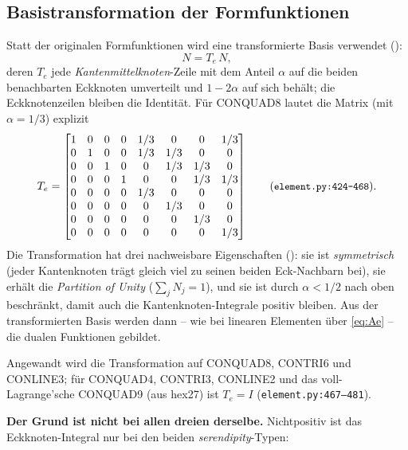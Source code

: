 \documentclass[a4paper,11pt]{article}
\def\bm#1{#1}%
\def\tfrac#1#2{#1/#2}%
\def\tilde#1{#1}%
\newcommand{\file}[1]{\texttt{\small #1}}
\begin{document}
\subsection{Basistransformation der Formfunktionen}
Statt der originalen Formfunktionen wird eine transformierte Basis verwendet
(\citealp[Gl.~(4.5)]{popp2012}):
\begin{equation}
\tilde{\bm N} = \bm T_e\,\bm N,
\end{equation}
deren $\bm T_e$ jede \emph{Kantenmittelknoten}-Zeile mit dem Anteil $\alpha$ auf die beiden
benachbarten Eckknoten umverteilt und $1-2\alpha$ auf sich behält; die Eckknotenzeilen bleiben die
Identität. Für CONQUAD8 lautet die Matrix (mit $\alpha=\tfrac13$) explizit
\begin{equation}
\bm T_e=\begin{bmatrix}
1&0&0&0&\tfrac13&0&0&\tfrac13\\
0&1&0&0&\tfrac13&\tfrac13&0&0\\
0&0&1&0&0&\tfrac13&\tfrac13&0\\
0&0&0&1&0&0&\tfrac13&\tfrac13\\
0&0&0&0&\tfrac13&0&0&0\\
0&0&0&0&0&\tfrac13&0&0\\
0&0&0&0&0&0&\tfrac13&0\\
0&0&0&0&0&0&0&\tfrac13
\end{bmatrix}
\qquad (\text{\file{element.py:\allowbreak{}424--468}}).
\end{equation}
Die Transformation hat drei nachweisbare Eigenschaften (\citealp[S.~B431]{popp2012}): sie ist
\emph{symmetrisch} (jeder Kantenknoten trägt gleich viel zu seinen beiden Eck-Nachbarn bei), sie
erhält die \emph{Partition of Unity} ($\sum_j \tilde N_j = 1$), und sie ist durch
$\alpha < \tfrac12$ nach oben beschränkt, damit auch die Kantenknoten-Integrale positiv bleiben. Aus
der transformierten Basis werden dann -- wie bei linearen Elementen über \eqref{eq:Ae} -- die dualen
Funktionen gebildet.

Angewandt wird die Transformation auf CONQUAD8, CONTRI6 und CONLINE3; für CONQUAD4, CONTRI3,
CONLINE2 und das voll-Lagrange'sche CONQUAD9 (aus hex27) ist $\bm T_e=\bm I$
(\file{element.py:\allowbreak{}467--481}).

\medskip
\noindent\textbf{Der Grund ist nicht bei allen dreien derselbe.} Nichtpositiv ist das
Eckknoten-Integral nur bei den beiden \emph{serendipity}-Typen:
\end{document}
